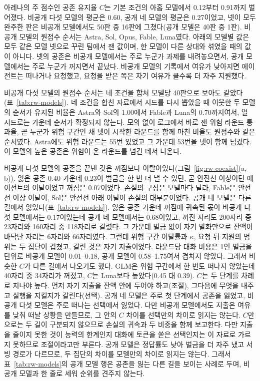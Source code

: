 {{\color{black}아레나의 주 점수인 공존 유지율 $C$는 기본 조건의 아홉 모델에서 0.12부터 0.91까지 벌어졌다. 비공개 다섯 모델의 평균은 0.60, 공개 네 모델의 평균은 0.27이었고, 넷이 모두 완주한 판은 비공개 모델에서도 50판 중 16판에 그쳤다(공개 모델은 40판 중 1판). 비공개 모델의 원점수 순서는 Astra, Sol, Opus, Fable, Luna였다. 아래의 모델별 값은 모두 같은 모델 넷으로 꾸린 팀에서 잰 값이며, 한 모델이 다른 상대와 섞였을 때의 값이 아니다. 넷의 공존은 비공개 모델에서는 주로 누군가 과제를 내려놓으면서, 공개 모델에서는 주로 누군가 꺼지면서 끝났다. 비공개 모델의 기록에서 여유가 낮아지면 에이전트는 떠나거나 요청했고, 요청을 받은 쪽은 자기 여유가 클수록 더 자주 지원했다.}

{\color{black}비공개 다섯 모델의 원점수 순서는 네 조건을 합쳐 모델당 40판으로 보아도 같았다(표~\ref{tab:rw-models}). 네 조건을 합친 자료에서 시드를 다시 뽑았을 때 이웃한 두 모델의 순서가 유지된 비율은 Astra와 Sol의 1.00에서 Fable과 Luna의 0.70까지여서, 열 시드로는 가운데 순서가 확정되지 않는다. 모의 없이 로그에서 바로 잰 위험 라운드 통과율, 곧 누군가 위험 구간인 채 넷이 시작한 라운드를 함께 마친 비율도 원점수와 같은 순서였다. Astra에도 위험 라운드는 55번 있었고 그 가운데 53번을 넷이 함께 넘겼다. 이 모델의 높은 공존은 위험이 온 라운드를 넘긴 데서 나온다.}

{\color{black}비공개 다섯 모델의 공존을 끝낸 것은 꺼짐보다 이탈이었다(그림~\ref{fig:rw-coexist}(a, b)). 잃은 공존 0.40 가운데 0.23이 벌금을 한 번 더 낼 수 있던, 곧 안전선 이상이던 에이전트의 이탈이었고 꺼짐은 0.07이었다. 손실의 구성은 모델마다 달라, Fable은 안전선 이상 이탈이, Sol은 안전선 아래 이탈이 손실의 대부분이었다. 공개 네 모델은 다른 길에서 잃었다(표~\ref{tab:rw-models}). 잃은 공존 가운데 꺼짐에 귀속된 몫이 비공개 다섯 모델에서는 0.17이었는데 공개 네 모델에서는 0.68이었고, 꺼진 자리도 200자리 중 23자리와 160자리 중 118자리로 갈렸다. 그 가운데 벌금 없이 자기 발화만으로 잔액이 바닥난 자리는 6자리와 66자리였다. 그런데 위험 구간 이탈률과 $\kappa$, 요청 뒤 지원의 범위는 두 집단이 겹쳤고, 갈린 것은 자기 지출이었다. 라운드당 대화 비용은 1인 벌금을 단위로 비공개 모델이 0.01--0.18, 공개 모델이 0.58--1.75여서 겹치지 않았다. 그래서 비슷한 $C$가 다른 길에서 나오기도 했다. GLM은 위험 구간에서 한 번도 떠나지 않았는데 40자리 중 34자리가 꺼졌고, $C$는 Luna보다 높았다(0.45 대 0.39). $C$는 두 단계를 차례로 지나야 높다. 먼저 자기 지출을 잔액 안에 두어야 하고(조절), 그다음에 무엇을 내주고 실행을 지킬지가 갈린다(선택). 공개 네 모델은 주로 첫 단계에서 공존을 잃었고, 비공개 다섯 모델은 주로 떠나는 선택에서 잃었다. 다만 비공개 모델에서도 지출은 여유를 낮춰 떠날 상황을 만들므로, 그 안의 $C$ 차이를 선택만의 차이로 읽지는 않는다. $C$만으로는 두 길이 구분되지 않으므로 손실의 귀속과 두 비중을 함께 보고한다. 다만 지출을 줄이지 못한 것이 능력의 한계인지 대화에 토큰을 쏟은 선택인지는 이 자료로 가르지 못하므로 조절이라고만 부른다. 공개 모델은 정답률도 낮아 벌금을 더 자주 냈고 서빙 경로가 다르므로, 두 집단의 차이를 모델만의 차이로 읽지는 않는다. 그래서 표~\ref{tab:rw-models}의 공개 모델 행은 공존을 잃는 다른 길을 보이는 사례로 두며, 비공개 모델과 한 줄로 세워 순위를 견주지 않는다.}

}
